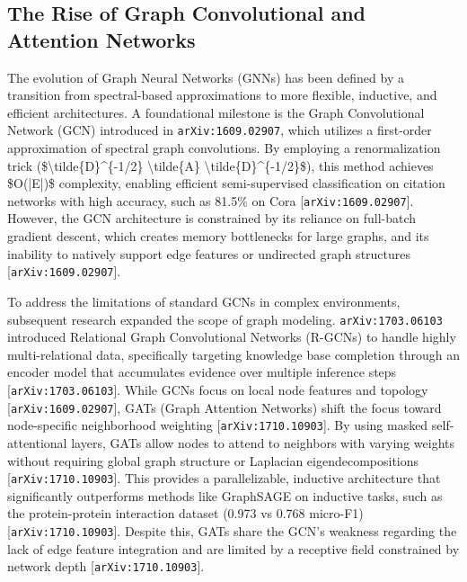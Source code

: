 \documentclass[11pt]{article}
\begin{document}
\subsection{The Rise of Graph Convolutional and Attention Networks}

The evolution of Graph Neural Networks (GNNs) has been defined by a transition from spectral-based approximations to more flexible, inductive, and efficient architectures. A foundational milestone is the Graph Convolutional Network (GCN) introduced in \texttt{arXiv:1609.02907}, which utilizes a first-order approximation of spectral graph convolutions. By employing a renormalization trick (\$\textbackslash{}tilde\{D\}\textasciicircum{}\{-1/2\} \textbackslash{}tilde\{A\} \textbackslash{}tilde\{D\}\textasciicircum{}\{-1/2\}\$), this method achieves \$O(|E|)\$ complexity, enabling efficient semi-supervised classification on citation networks with high accuracy, such as 81.5\% on Cora [\texttt{arXiv:1609.02907}]. However, the GCN architecture is constrained by its reliance on full-batch gradient descent, which creates memory bottlenecks for large graphs, and its inability to natively support edge features or undirected graph structures [\texttt{arXiv:1609.02907}].

To address the limitations of standard GCNs in complex environments, subsequent research expanded the scope of graph modeling. \texttt{arXiv:1703.06103} introduced Relational Graph Convolutional Networks (R-GCNs) to handle highly multi-relational data, specifically targeting knowledge base completion through an encoder model that accumulates evidence over multiple inference steps [\texttt{arXiv:1703.06103}]. While GCNs focus on local node features and topology [\texttt{arXiv:1609.02907}], GATs (Graph Attention Networks) shift the focus toward node-specific neighborhood weighting [\texttt{arXiv:1710.10903}]. By using masked self-attentional layers, GATs allow nodes to attend to neighbors with varying weights without requiring global graph structure or Laplacian eigendecompositions [\texttt{arXiv:1710.10903}]. This provides a parallelizable, inductive architecture that significantly outperforms methods like GraphSAGE on inductive tasks, such as the protein-protein interaction dataset (0.973 vs 0.768 micro-F1) [\texttt{arXiv:1710.10903}]. Despite this, GATs share the GCN's weakness regarding the lack of edge feature integration and are limited by a receptive field constrained by network depth [\texttt{arXiv:1710.10903}].
\end{document}
